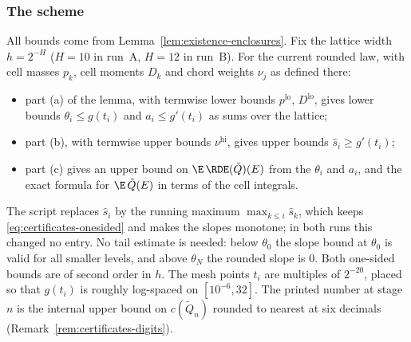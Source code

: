\subsubsection*{The scheme}
All bounds come from Lemma~\ref{lem:existence-enclosures}. Fix the lattice width $h=2^{-H}$
($H=10$ in run~A, $H=12$ in run~B). For the current rounded law, with cell masses $p_k$,
cell moments $D_k$ and chord weights $\nu_j$ as defined there:
\begin{itemize}
\item part (a) of the lemma, with termwise lower bounds
$p^{\mathrm{lo}}$, $D^{\mathrm{lo}}$, gives lower bounds $\theta_i\le g(t_i)$ and
$a_i\le g'(t_i)$ as sums over the lattice;
\item part (b), with termwise upper bounds $\nu^{\mathrm{hi}}$, gives upper bounds
$\hat s_i\ge g'(t_i)$;
\item part (c) gives an upper bound on $\E\,\RDE(\tilde Q)(E)$ from the $\theta_i$ and
$a_i$, and the exact formula for $\E\,\tilde Q(E)$ in terms of the cell integrals.
\end{itemize}
The script replaces $\hat s_i$ by the running maximum $\max_{k\le i}\hat s_k$, which keeps
\eqref{eq:certificates-onesided} and makes the slopes monotone; in both runs this changed no
entry. No tail estimate is needed: below $\theta_0$ the slope bound at $\theta_0$ is valid
for all smaller levels, and above $\theta_N$ the rounded slope is $0$. Both one-sided bounds
are of second order in $h$. The mesh points $t_i$ are multiples of $2^{-20}$, placed so that
$g(t_i)$ is roughly log-spaced on $[10^{-6},32]$. The printed number at stage $n$ is the
internal upper bound on $c(\tilde Q_n)$ rounded to nearest at six decimals
(Remark~\ref{rem:certificates-digits}).

